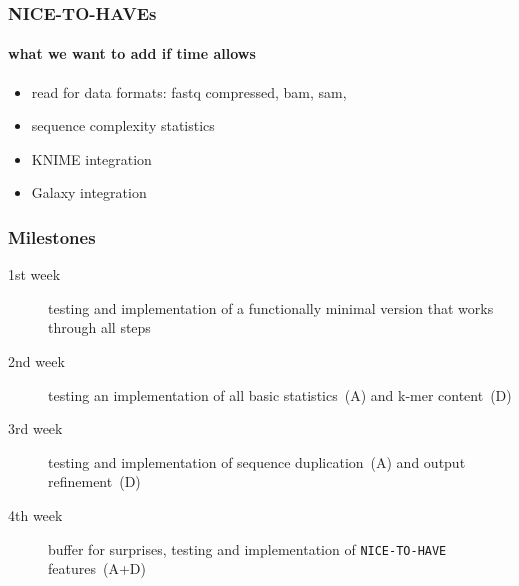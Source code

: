 \documentclass{beamer}
\begin{document}
\begin{frame}
 \frametitle{NICE-TO-HAVEs}
 \framesubtitle{what we want to add if time allows}
\begin{itemize}
 \item read for data formats: fastq compressed, bam, sam, 
 \item sequence complexity statistics
 \item KNIME integration
 \item Galaxy integration
\end{itemize}
  

\end{frame}


\begin{frame}
 \frametitle{ Milestones }
 \begin{description}
  \item [1st week] testing and implementation of a functionally minimal version that works through all steps
  \item [2nd week] testing an implementation of all basic statistics~(A) and k-mer content~(D)
  \item [3rd week] testing and implementation of sequence duplication~(A) and output refinement~(D)
  \item [4th week] buffer for surprises, testing and implementation of \texttt{NICE-TO-HAVE} features~(A+D) 
 \end{description}
 
\end{frame}
\end{document}
